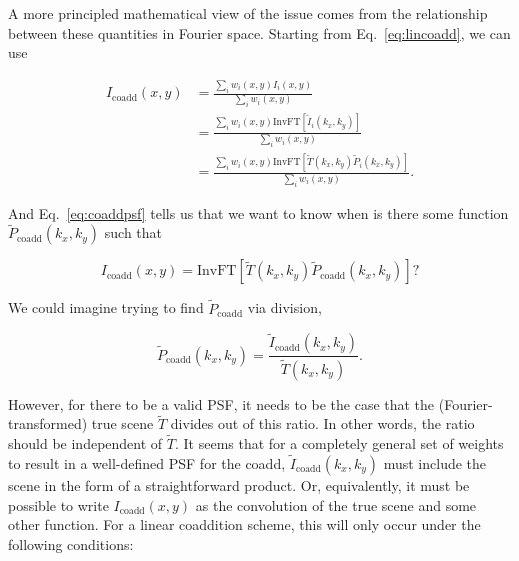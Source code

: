 \documentclass{aastex63}
\newcommand{\irresponse}[1]{{#1}}
\begin{document}
 
 A more principled mathematical view of the issue comes from the relationship between these quantities in Fourier space.  Starting from Eq.~\eqref{eq:lincoadd}, we can use
 \begin{linenomath}\begin{align*}
     I_\text{coadd}(x,y) &= \frac{\sum_i w_i(x,y) I_i(x,y)}{\sum_i w_i(x,y)} \\
     &= \frac{\sum_i w_i(x,y) \text{InvFT}[\widetilde{I}_i(k_x,k_y)]}{\sum_i w_i(x,y)}\\
     &= \frac{\sum_i w_i(x,y) \text{InvFT}[\widetilde{T}(k_x,k_y)\widetilde{P}_i(k_x,k_y)]}{\sum_i w_i(x,y)}.
 \end{align*}\end{linenomath}
And Eq.~\eqref{eq:coaddpsf} tells us that we want to know when is there some function $\widetilde{P}_\text{coadd}(k_x,k_y)$ such that
\begin{linenomath}\begin{equation*}
    I_\text{coadd}(x,y) = \text{InvFT}[\widetilde{T}(k_x,k_y)\widetilde{P}_\text{coadd}(k_x,k_y)]?
\end{equation*}\end{linenomath}
We could imagine trying to find $\widetilde{P}_\text{coadd}$ via division,
\begin{linenomath}\begin{equation}\label{eq:fourier_solve}
    \widetilde{P}_\text{coadd}(k_x,k_y) = \frac{\widetilde{I}_\text{coadd}(k_x,k_y)}{\widetilde{T}(k_x,k_y)}.
\end{equation}\end{linenomath}
However, for there to be a valid PSF, it needs to be the case that the \irresponse{(Fourier-transformed) true scene $\widetilde{T}$} divides out of this ratio. In other words, the ratio should be independent of $\widetilde{T}$.  It seems that for a completely general set of weights to result in a well-defined PSF for the coadd, $\widetilde{I}_\text{coadd}(k_x,k_y)$ must include the scene in the form of a straightforward product.  Or, equivalently, it must be possible to write $I_\text{coadd}(x,y)$ as the convolution of the true scene and some other function.   For a linear coaddition scheme, this will only occur under the following conditions:
\end{document}
